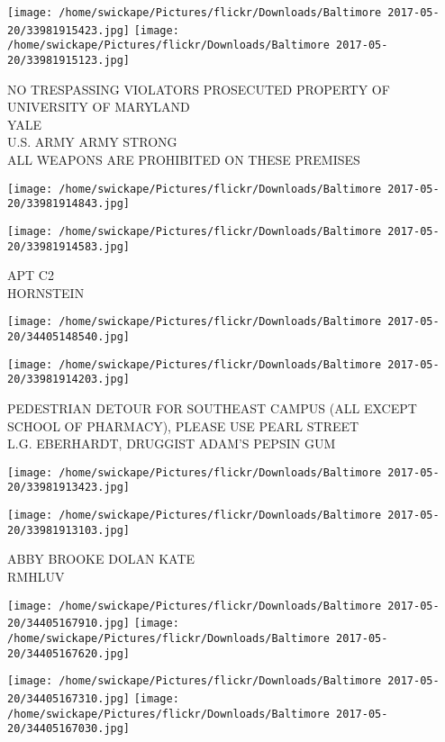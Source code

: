 \documentclass[10pt,letterpaper]{article}
\begin{document}
\texttt{[image: /home/swickape/Pictures/flickr/Downloads/Baltimore 2017-05-20/33981915423.jpg]}
\texttt{[image: /home/swickape/Pictures/flickr/Downloads/Baltimore 2017-05-20/33981915123.jpg]}

NO TRESPASSING VIOLATORS PROSECUTED PROPERTY OF UNIVERSITY OF MARYLAND\\
YALE\\
U.S. ARMY ARMY STRONG\\
ALL WEAPONS ARE PROHIBITED ON THESE PREMISES\\
\pagebreak

\texttt{[image: /home/swickape/Pictures/flickr/Downloads/Baltimore 2017-05-20/33981914843.jpg]}

\vspace{0.25in}
\texttt{[image: /home/swickape/Pictures/flickr/Downloads/Baltimore 2017-05-20/33981914583.jpg]}

APT C2\\
HORNSTEIN\\
\pagebreak

\texttt{[image: /home/swickape/Pictures/flickr/Downloads/Baltimore 2017-05-20/34405148540.jpg]}

\vspace{0.25in}
\texttt{[image: /home/swickape/Pictures/flickr/Downloads/Baltimore 2017-05-20/33981914203.jpg]}

PEDESTRIAN DETOUR FOR SOUTHEAST CAMPUS (ALL EXCEPT SCHOOL OF PHARMACY), PLEASE USE PEARL STREET\\
L.G. EBERHARDT, DRUGGIST ADAM'S PEPSIN GUM\\
\pagebreak

\texttt{[image: /home/swickape/Pictures/flickr/Downloads/Baltimore 2017-05-20/33981913423.jpg]}

\vspace{0.25in}
\texttt{[image: /home/swickape/Pictures/flickr/Downloads/Baltimore 2017-05-20/33981913103.jpg]}

ABBY BROOKE DOLAN KATE\\
RMHLUV\\
\pagebreak

\texttt{[image: /home/swickape/Pictures/flickr/Downloads/Baltimore 2017-05-20/34405167910.jpg]}
\texttt{[image: /home/swickape/Pictures/flickr/Downloads/Baltimore 2017-05-20/34405167620.jpg]}

\texttt{[image: /home/swickape/Pictures/flickr/Downloads/Baltimore 2017-05-20/34405167310.jpg]}
\texttt{[image: /home/swickape/Pictures/flickr/Downloads/Baltimore 2017-05-20/34405167030.jpg]}
\end{document}
